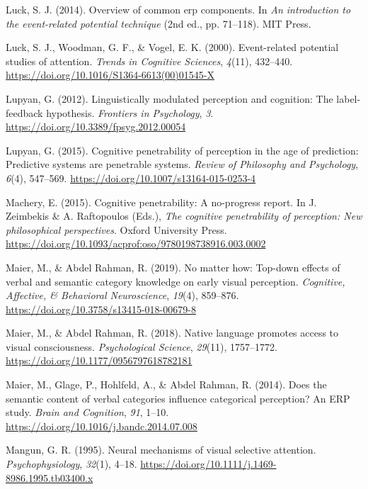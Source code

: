 \documentclass[
  english,
  man,floatsintext]{apa7}
\begin{document}
\leavevmode\hypertarget{ref-luck2014}{}%
Luck, S. J. (2014). Overview of common erp components. In \emph{An introduction to the event-related potential technique} (2nd ed., pp. 71--118). MIT Press.

\leavevmode\hypertarget{ref-luck2000}{}%
Luck, S. J., Woodman, G. F., \& Vogel, E. K. (2000). Event-related potential studies of attention. \emph{Trends in Cognitive Sciences}, \emph{4}(11), 432--440. \url{https://doi.org/10.1016/S1364-6613(00)01545-X}

\leavevmode\hypertarget{ref-lupyan2012}{}%
Lupyan, G. (2012). Linguistically modulated perception and cognition: The label-feedback hypothesis. \emph{Frontiers in Psychology}, \emph{3}. \url{https://doi.org/10.3389/fpsyg.2012.00054}

\leavevmode\hypertarget{ref-lupyan2015}{}%
Lupyan, G. (2015). Cognitive penetrability of perception in the age of prediction: Predictive systems are penetrable systems. \emph{Review of Philosophy and Psychology}, \emph{6}(4), 547--569. \url{https://doi.org/10.1007/s13164-015-0253-4}

\leavevmode\hypertarget{ref-machery2015}{}%
Machery, E. (2015). Cognitive penetrability: A no-progress report. In J. Zeimbekis \& A. Raftopoulos (Eds.), \emph{The cognitive penetrability of perception: New philosophical perspectives}. Oxford University Press. \url{https://doi.org/10.1093/acprof:oso/9780198738916.003.0002}

\leavevmode\hypertarget{ref-maier2019}{}%
Maier, M., \& Abdel Rahman, R. (2019). No matter how: Top-down effects of verbal and semantic category knowledge on early visual perception. \emph{Cognitive, Affective, \& Behavioral Neuroscience}, \emph{19}(4), 859--876. \url{https://doi.org/10.3758/s13415-018-00679-8}

\leavevmode\hypertarget{ref-maier2018}{}%
Maier, M., \& Abdel Rahman, R. (2018). Native language promotes access to visual consciousness. \emph{Psychological Science}, \emph{29}(11), 1757--1772. \url{https://doi.org/10.1177/0956797618782181}

\leavevmode\hypertarget{ref-maier2014}{}%
Maier, M., Glage, P., Hohlfeld, A., \& Abdel Rahman, R. (2014). Does the semantic content of verbal categories influence categorical perception? An ERP study. \emph{Brain and Cognition}, \emph{91}, 1--10. \url{https://doi.org/10.1016/j.bandc.2014.07.008}

\leavevmode\hypertarget{ref-mangun1995}{}%
Mangun, G. R. (1995). Neural mechanisms of visual selective attention. \emph{Psychophysiology}, \emph{32}(1), 4--18. \url{https://doi.org/10.1111/j.1469-8986.1995.tb03400.x}
\end{document}
